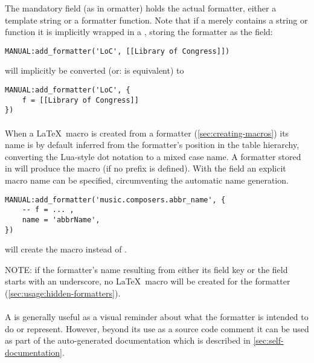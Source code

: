 \documentclass[12pt]{scrartcl}
\begin{document}
The mandatory field  (as in ormatter) holds the
actual formatter, either a template string or a formatter function.  Note that
if a  merely contains a string or function it is
implicitly wrapped in a , storing the formatter as
the  field:


\begin{verbatim}
MANUAL:add_formatter('LoC', [[Library of Congress]])
\end{verbatim}

\noindent will implicitly be converted (or: is equivalent) to

\begin{verbatim}
MANUAL:add_formatter('LoC', {
	f = [[Library of Congress]]
})
\end{verbatim}


\paragraph{}

When a \LaTeX\ macro is created from a formatter (\vref{sec:creating-macros}) its name is by default inferred from the
formatter's position in the table hierarchy, converting the Lua-style dot
notation to a mixed case name.  A formatter stored in 
will produce the macro  (if no prefix is defined).  With the
 field an explicit macro name can be specified, circumventing the
automatic name generation.

\begin{verbatim}
MANUAL:add_formatter('music.composers.abbr_name', {
	-- f = ... ,
	name = 'abbrName',
})
\end{verbatim}

\noindent will create the macro  instead of .

NOTE: if the formatter's name resulting from either its field key or the
 field starts with an underscore, no \LaTeX\ macro will be created
for the formatter (\vref{sec:usage:hidden-formatters}).


\paragraph{}

A  is generally useful as a visual reminder about what the
formatter is intended to do or represent.  However, beyond its use as a source
code comment it can be used as part of the auto-generated documentation which is
described in \vref{sec:self-documentation}.
\end{document}
